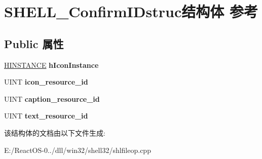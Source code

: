 \hypertarget{struct_s_h_e_l_l___confirm_i_dstruc}{}\section{S\+H\+E\+L\+L\+\_\+\+Confirm\+I\+Dstruc结构体 参考}
\label{struct_s_h_e_l_l___confirm_i_dstruc}
\subsection*{Public 属性}
\begin{DoxyCompactItemize}
\item 
\mbox{\label{struct_s_h_e_l_l___confirm_i_dstruc_a10e0912265d1bead90c1defb102bac97}} 
\hyperlink{interfacevoid}{H\+I\+N\+S\+T\+A\+N\+CE} {\bfseries h\+Icon\+Instance}
\item 
\mbox{\label{struct_s_h_e_l_l___confirm_i_dstruc_a22b05def3e602cc01b33a70c40f25157}} 
U\+I\+NT {\bfseries icon\+\_\+resource\+\_\+id}
\item 
\mbox{\label{struct_s_h_e_l_l___confirm_i_dstruc_a73395ae517e10c8cecdfb70a293fb2c8}} 
U\+I\+NT {\bfseries caption\+\_\+resource\+\_\+id}
\item 
\mbox{\label{struct_s_h_e_l_l___confirm_i_dstruc_a2685d20826fb1449502cb9ce4875dbd5}} 
U\+I\+NT {\bfseries text\+\_\+resource\+\_\+id}
\end{DoxyCompactItemize}


该结构体的文档由以下文件生成\+:\begin{DoxyCompactItemize}
\item 
E\+:/\+React\+O\+S-\/0../dll/win32/shell32/shlfileop.\+cpp\end{DoxyCompactItemize}
